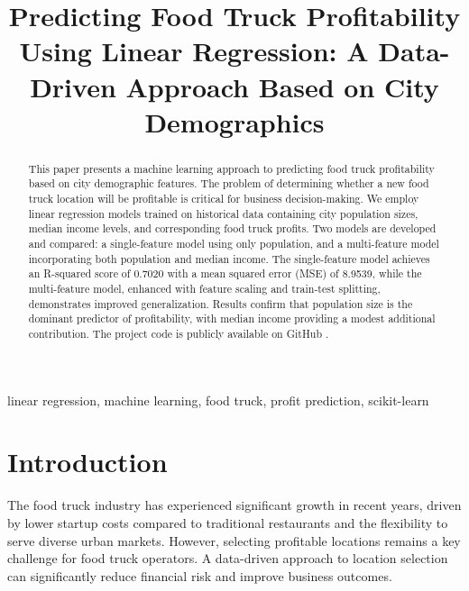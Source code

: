 \documentclass[conference]{IEEEtran}
\begin{document}
\title{Predicting Food Truck Profitability Using Linear Regression: A Data-Driven Approach Based on City Demographics}

\author{
}

\maketitle

\begin{abstract}
This paper presents a machine learning approach to predicting food truck profitability based on city demographic features. The problem of determining whether a new food truck location will be profitable is critical for business decision-making. We employ linear regression models trained on historical data containing city population sizes, median income levels, and corresponding food truck profits. Two models are developed and compared: a single-feature model using only population, and a multi-feature model incorporating both population and median income. The single-feature model achieves an R-squared score of 0.7020 with a mean squared error (MSE) of 8.9539, while the multi-feature model, enhanced with feature scaling and train-test splitting, demonstrates improved generalization. Results confirm that population size is the dominant predictor of profitability, with median income providing a modest additional contribution. The project code is publicly available on GitHub \cite{b1}.
\end{abstract}

\begin{IEEEkeywords}
linear regression, machine learning, food truck, profit prediction, scikit-learn
\end{IEEEkeywords}

\section{Introduction}

The food truck industry has experienced significant growth in recent years, driven by lower startup costs compared to traditional restaurants and the flexibility to serve diverse urban markets. However, selecting profitable locations remains a key challenge for food truck operators. A data-driven approach to location selection can significantly reduce financial risk and improve business outcomes.
\end{document}
